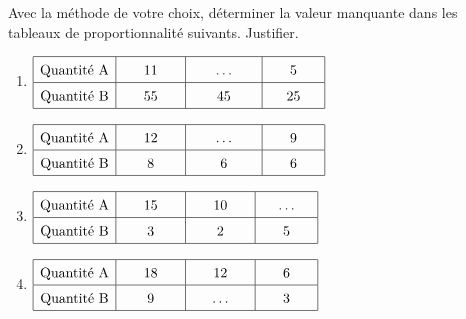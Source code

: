 \documentclass[11pt]{article}
\begin{document}
\begin{exercicedevoir}
Avec la méthode de votre choix, déterminer la valeur manquante dans les tableaux de
proportionnalité suivants. Justifier.
\begin{multicols}{2}
\begin{enumerate}
\item 
$\renewcommand{\arraystretch}{1.5}
\begin{array}{|c|c|c|c|} \hline
\text{Quantité A} & \phantom{000}11\phantom{000} & \phantom{000}\ldots\phantom{000} & \phantom{000}5\phantom{000} \\
\hline
\text{Quantité B} & 55 & 45 & 25 \\ 
\hline
\end{array}$

\item 
$\renewcommand{\arraystretch}{1.5}
\begin{array}{|c|c|c|c|} \hline
\text{Quantité A} & \phantom{000}12\phantom{000} & \phantom{000}\ldots\phantom{000} & \phantom{000}9\phantom{000} \\
\hline
\text{Quantité B} & 8 & 6 & 6 \\ 
\hline
\end{array}$

\item 
$\renewcommand{\arraystretch}{1.5}
\begin{array}{|c|c|c|c|}
\hline
\text{Quantité A} & \phantom{000}15\phantom{000} & \phantom{000}10\phantom{000} & \ldots \\ 
\hline
\text{Quantité B} & 3 & 2 & \phantom{000}5\phantom{000} \\ 
\hline
\end{array}$

\item 
$\renewcommand{\arraystretch}{1.5}
\begin{array}{|c|c|c|c|}
\hline
\text{Quantité A} & \phantom{000}18\phantom{000} & \phantom{000}12\phantom{000} & \phantom{000}6\phantom{000} \\ 
\hline
\text{Quantité B} & 9 & \ldots & 3 \\ 
\hline
\end{array}$

\end{enumerate}
\end{multicols}



\end{exercicedevoir}
\end{document}
